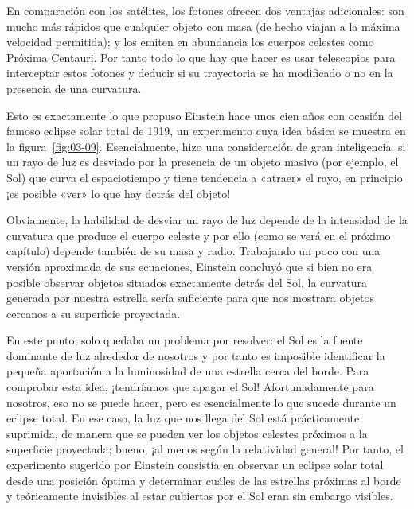 En comparación con los satélites, los fotones ofrecen dos ventajas adicionales: son mucho más
rápidos que cualquier objeto con masa (de hecho viajan a la máxima velocidad permitida); y los
emiten en abundancia los cuerpos celestes como Próxima Centauri. Por tanto todo lo que hay que
hacer es usar telescopios para interceptar estos fotones y deducir si su trayectoria se ha
modificado o no en la presencia de una curvatura.

Esto es exactamente lo que propuso Einstein hace unos cien años con ocasión del famoso eclipse
solar total de 1919, un experimento cuya idea básica se muestra en la figura~\ref{fig:03-09}.
Esencialmente, hizo una consideración de gran inteligencia: si un rayo de luz es desviado por
la presencia de un objeto masivo (por ejemplo, el Sol) que curva el espaciotiempo y tiene
tendencia a «atraer» el rayo, en principio ¡es posible «ver» lo que hay detrás del objeto!

Obviamente, la habilidad de desviar un rayo de luz depende de la intensidad de la curvatura que
produce el cuerpo celeste y por ello (como se verá en el próximo capítulo) depende también de
su masa y radio. Trabajando un poco con una versión aproximada de sus ecuaciones, Einstein
concluyó que si bien no era posible observar objetos situados exactamente detrás del Sol, la
curvatura generada por nuestra estrella sería suficiente para que nos mostrara objetos cercanos
a su superficie proyectada.

En este punto, solo quedaba un problema por resolver: el Sol es la fuente dominante de luz
alrededor de nosotros y por tanto es imposible identificar la pequeña aportación a la
luminosidad de una estrella cerca del borde. Para comprobar esta idea, ¡tendríamos que apagar
el Sol! Afortunadamente para nosotros, eso no se puede hacer, pero es esencialmente lo que
sucede durante un eclipse total. En ese caso, la luz que nos llega del Sol está prácticamente
suprimida, de manera que se pueden ver los objetos celestes próximos a la superficie
proyectada; bueno, ¡al menos según la relatividad general! Por tanto, el experimento sugerido
por Einstein consistía en observar un eclipse solar total desde una posición óptima y
determinar cuáles de las estrellas próximas al borde y teóricamente invisibles al estar
cubiertas por el Sol eran sin embargo visibles.

